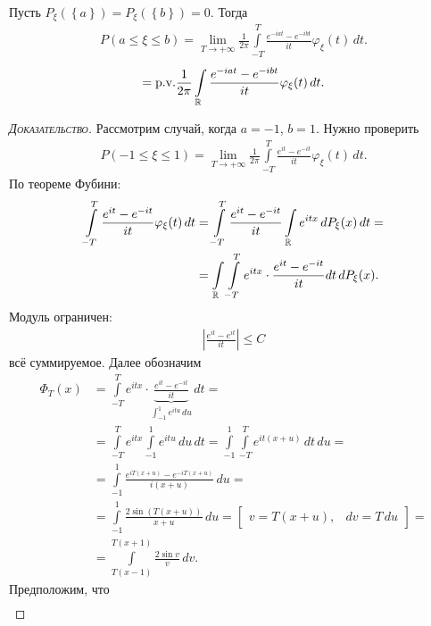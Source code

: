 \documentclass[../main.tex]{subfiles}
\begin{document}
\begin{thm}
 Пусть $ P_\xi(\left\{ a \right\}) = P_\xi(\left\{ b \right\}) = 0 $. Тогда
 \begin{align*}
  P(a \leqslant \xi \leqslant b) = \lim_{T \to +\infty} \frac{1}{2\pi} \int\limits_{-T}^{T}  \frac{e^{-iat}-e^{-ibt}}{it} \varphi_\xi(t)\,dt.
 \end{align*}
 \begin{align*}
  = \mathrm{p.v.} \frac{1}{2\pi} \int\limits_{\mathbb{R}} \frac{e^{-iat}-e^{-ibt}}{it} \varphi_\xi(t)\,dt.
 \end{align*}
\end{thm}
\begin{proof}[\normalfont\textsc{Доказательство}]
 Рассмотрим случай, когда $ a = -1 $, $ b = 1 $. Нужно проверить
 \begin{align*}
  P(-1 \leqslant \xi \leqslant 1) = \lim_{T \to +\infty} \frac{1}{2\pi}\int\limits_{-T}^{T} \frac{e^{it}-e^{-it}}{it}\varphi_\xi(t)\,dt.
 \end{align*}
 По теореме Фубини:
 \begin{align*}
  \int\limits_{-T}^{T} \frac{e^{it}-e^{-it}}{it}\varphi_\xi(t)\,dt &= \int\limits_{-T}^{T} \frac{e^{it}-e^{-it}}{it} \int\limits_{\mathbb{R}} e^{itx}\,dP_\xi(x)\,dt = \\
  &= \int\limits_{\mathbb{R}} \int\limits_{-T}^{T} e^{itx} \cdot \frac{e^{it}-e^{-it}}{it}dt\,dP_\xi(x). 
 \end{align*} Модуль ограничен:
 \begin{align*}
  \left| \frac{e^{it}-e^{it}}{it} \right| \leqslant C
 \end{align*} всё суммируемое. Далее обозначим
 \begin{align*}
  \Phi_T(x) &= \int\limits_{-T}^{T} e^{itx} \cdot \underbrace{\frac{e^{it}-e^{-it}}{it}}_{\int_{-1}^{1} e^{itu}\,du}\,dt = \\
  &= \int\limits_{-T}^{T} e^{itx}\int\limits_{-1}^{1} e^{itu}\,du\,dt = \int\limits_{-1}^{1} \int\limits_{-T}^{T} e^{it(x+u)}\,dt\,du = \\
  &= \int\limits_{-1}^{1} \frac{e^{iT(x+u)} - e^{-iT(x+u)}}{i(x+u)}\,du = \\
  &= \int\limits_{-1}^{1} \frac{2\sin(T(x+u))}{x+u}\,du = \begin{bmatrix}
   v = T(x+u), & dv = T\,du
  \end{bmatrix} = \\
  &= \int\limits_{T(x-1)}^{T(x+1)} \frac{2\sin v}{v}\,dv.
 \end{align*} Предположим, что
 \begin{align*}

\end{align*}
\end{proof}
\end{document}
